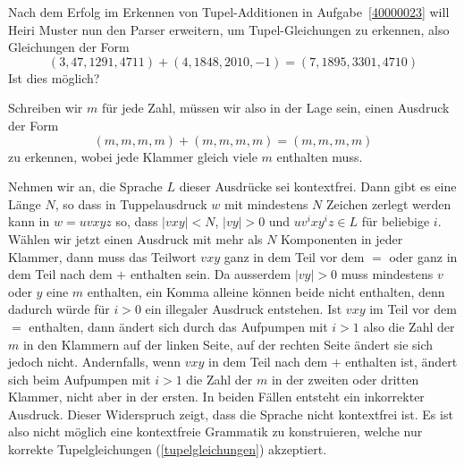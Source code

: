Nach dem Erfolg im Erkennen von Tupel-Additionen in
Aufgabe~\ref{40000023}
will Heiri Muster nun den Parser erweitern, um Tupel-Gleichungen
zu erkennen, also Gleichungen der Form
\[
(3,47,1291,4711)+(4,1848,2010,-1)=(7,1895,3301,4710)
\]
Ist dies möglich?


\begin{loesung}
Schreiben wir $m$ für jede Zahl, müssen wir also in der Lage
sein, einen Ausdruck der Form
\begin{equation}
(m,m,m,m)+(m,m,m,m)=(m,m,m,m)
\label{tupelgleichungen}
\end{equation}
zu erkennen, wobei jede Klammer gleich viele $m$ enthalten muss.

Nehmen wir an, die Sprache $L$ dieser Ausdrücke sei kontextfrei.
Dann gibt
es eine Länge $N$, so dass in Tuppelausdruck $w$ mit mindestens
$N$ Zeichen zerlegt werden kann in $w=uvxyz$ so, dass $|vxy|<N$,
$|vy|>0$ und $uv^ixy^iz\in L$ für beliebige $i$. Wählen wir jetzt
einen Ausdruck mit mehr als $N$ Komponenten in jeder Klammer,
dann muss das Teilwort $vxy$ ganz in dem Teil vor dem $=$ oder ganz
in dem Teil nach dem $+$ enthalten sein. Da ausserdem $|vy|>0$
muss mindestens $v$ oder $y$ eine $m$ enthalten, ein Komma alleine
können beide nicht enthalten, denn dadurch würde für $i>0$
ein illegaler Ausdruck entstehen. Ist $vxy$ im Teil vor dem $=$
enthalten, dann ändert sich durch das Aufpumpen mit $i>1$ also
die Zahl der $m$ in den Klammern auf der linken Seite, auf
der rechten Seite ändert sie sich jedoch nicht. Andernfalls,
wenn $vxy$ in dem Teil nach dem $+$ enthalten ist, ändert
sich beim Aufpumpen mit $i>1$ die Zahl der $m$ in der zweiten
oder dritten Klammer, nicht aber in der ersten. In beiden Fällen
entsteht ein inkorrekter Ausdruck. Dieser Widerspruch zeigt, dass
die Sprache nicht kontextfrei ist. Es ist also nicht möglich
eine kontextfreie Grammatik zu konstruieren, welche nur korrekte
Tupelgleichungen (\ref{tupelgleichungen}) akzeptiert.
\end{loesung}
